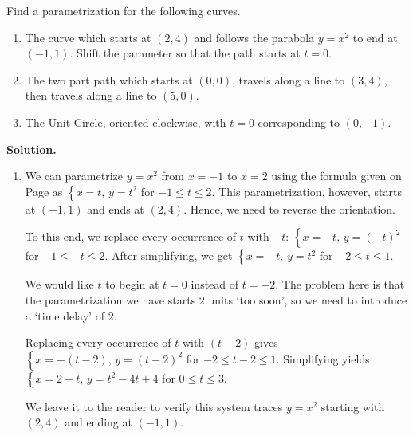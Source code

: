 \documentclass{ximera}
\begin{document}
\begin{ex} \label{adjustparametricex}  Find a parametrization for the following curves.

\begin{enumerate}

\item The curve which starts at $(2,4)$ and follows the parabola $y = x^2$ to end at $(-1,1)$.  Shift the parameter so that the path starts at $t=0$.

\item The two part path which starts at $(0,0)$, travels along a line to $(3,4)$, then travels along a line to $(5,0)$. 

\item  \label{adjustcircleex} The Unit Circle, oriented clockwise, with $t=0$ corresponding to $(0,-1)$.


\end{enumerate}

{\bf Solution.}  $~$

\begin{enumerate}

\item  We can parametrize $y = x^2$ from $x=-1$ to $x=2$ using the formula given on Page \pageref{commonparametrizations} as $\left\{x = t, \, y = t^2 \right.$ for $-1 \leq t \leq 2$.  This parametrization, however, starts at $(-1,1)$ and ends at $(2,4)$.  Hence, we need to reverse the orientation. 

\smallskip

To this end, we replace every occurrence of $t$ with $-t$:  $\left\{x = -t, \, y = (-t)^2 \right.$ for $-1 \leq -t \leq 2$.  After simplifying, we get  $\left\{x = -t, \, y = t^2 \right.$ for $-2 \leq t \leq 1$. 

\smallskip

 We would like $t$ to begin at $t=0$ instead of $t=-2$. The problem here is that the parametrization we have  starts $2$ units `too soon', so we need to introduce a `time delay' of $2$.  
 
 \smallskip
 
 Replacing every occurrence of $t$ with $(t-2)$ gives $\left\{x = -(t-2), \, y =(t-2) ^2 \right.$ for  $-2 \leq t -2 \leq 1$.  Simplifying yields $\left\{x = 2-t, \, y =t^2-4t+4\right.$ for $0 \leq t  \leq 3$.
 
 \smallskip
 
 We leave it to the reader to verify this system traces $y = x^2$ starting with $(2,4)$ and ending at $(-1,1)$.


\end{enumerate}
\end{ex}
\end{document}
